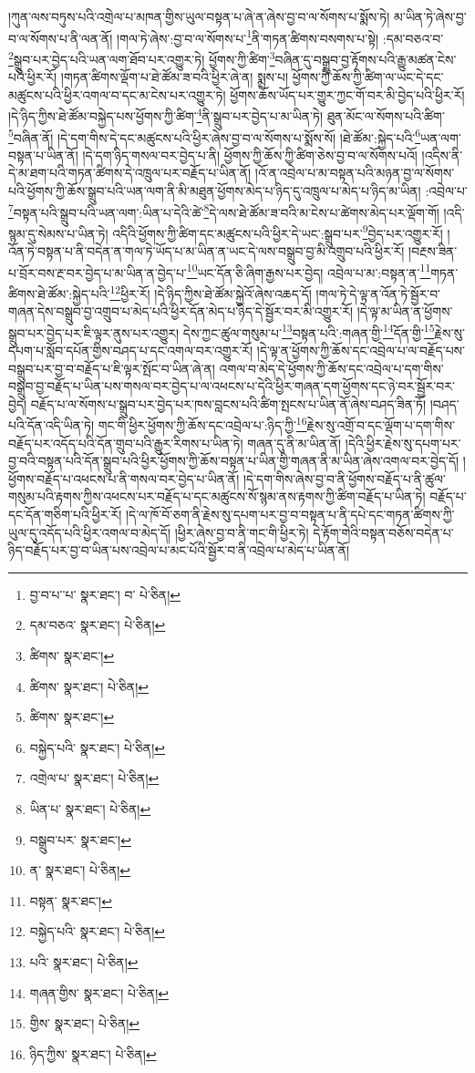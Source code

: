 །ཀུན་ལས་བཏུས་པའི་འགྲེལ་པ་མཁན་གྱིས་ཡུལ་བསྟན་པ་ཞེ་ན་ཞེས་བྱ་བ་ལ་སོགས་པ་སྨོས་ཏེ། མ་ཡིན་ཏེ་ཞེས་བྱ་བ་ལ་སོགས་པ་ནི་ལན་ནོ། །གལ་ཏེ་ཞེས་:བྱ་བ་ལ་སོགས་པ་\footnote{བྱ་བ་པ་་པ་  སྣར་ཐང་། བ་  པེ་ཅིན། }ནི་གཏན་ཚིགས་བསགས་པ་སྟེ། :དམ་བཅའ་བ་\footnote{དམ་བཅའ་  སྣར་ཐང་།  པེ་ཅིན། }སྒྲུབ་པར་བྱེད་པའི་ཡན་ལག་ཐོབ་པར་འགྱུར་ཏེ། ཕྱོགས་ཀྱི་ཚིག་\footnote{ཚིགས་  སྣར་ཐང་། }བཞིན་དུ་བསྒྲུབ་བྱ་རྟོགས་པའི་རྒྱུ་མཚན་ངེས་པའི་ཕྱིར་རོ། །གཏན་ཚིགས་ལྡོག་པ་ཐེ་ཚོམ་ཟ་བའི་ཕྱིར་ཞེ་ན། སྨྲས་པ། ཕྱོགས་ཀྱི་ཆོས་ཀྱི་ཚིག་ལ་ཡང་དེ་དང་མཚུངས་པའི་ཕྱིར་འགལ་བ་དང་མ་ངེས་པར་འགྱུར་ཏེ། ཕྱོགས་ཆོས་ཡོད་པར་གྱུར་ཀྱང་གོ་བར་མི་བྱེད་པའི་ཕྱིར་རོ། །དེ་ཉིད་ཀྱིས་ཐེ་ཚོམ་བསྐྱེད་པས་ཕྱོགས་ཀྱི་ཚིག་\footnote{ཚིགས་  སྣར་ཐང་།  པེ་ཅིན། }ནི་སྒྲུབ་པར་བྱེད་པ་མ་ཡིན་ཏེ། ཐུན་མོང་ལ་སོགས་པའི་ཚིག་\footnote{ཚིགས་  སྣར་ཐང་། }བཞིན་ནོ། །དེ་དག་གིས་དེ་དང་མཚུངས་པའི་ཕྱིར་ཞེས་བྱ་བ་ལ་སོགས་པ་སྨོས་སོ། །ཐེ་ཚོམ་:སྐྱེད་པའི་\footnote{བསྐྱེད་པའི་  སྣར་ཐང་།  པེ་ཅིན། }ཡན་ལག་བསྟན་པ་ཡིན་ནོ། །དེ་དག་ཉིད་གསལ་བར་བྱེད་པ་ནི། ཕྱོགས་ཀྱི་ཆོས་ཀྱི་ཚིག་ཅེས་བྱ་བ་ལ་སོགས་པའོ། །འདིས་ནི་དེ་མ་ཐག་པའི་གཏན་ཚིགས་དེ་འཁྲུལ་པར་བརྗོད་པ་ཡིན་ནོ། །འོ་ན་འབྲེལ་པ་མ་བསྟན་པའི་མཉན་བྱ་ལ་སོགས་པའི་ཕྱོགས་ཀྱི་ཆོས་སྒྲུབ་པའི་ཡན་ལག་ནི་མི་མཐུན་ཕྱོགས་མེད་པ་ཉིད་དུ་འཁྲུལ་པ་མེད་པ་ཉིད་མ་ཡིན། :འབྲེལ་པ་\footnote{འགྲེལ་པ་  སྣར་ཐང་།  པེ་ཅིན། }བསྟན་པའི་སྒྲུབ་པའི་ཡན་ལག་:ཡིན་པ་དེའི་ཚེ་\footnote{ཡིན་པ་  སྣར་ཐང་།  པེ་ཅིན། }དེ་ལས་ཐེ་ཚོམ་ཟ་བའི་མ་ངེས་པ་ཚེགས་མེད་པར་ལྡོག་གོ། །འདི་སྙམ་དུ་སེམས་པ་ཡིན་ཏེ། འདིའི་ཕྱོགས་ཀྱི་ཚིག་དང་མཚུངས་པའི་ཕྱིར་དེ་ཡང་:སྒྲུབ་པར་\footnote{བསྒྲུབ་པར་  སྣར་ཐང་། }བྱེད་པར་འགྱུར་རོ། །འོན་ཏེ་བསྟན་པ་ནི་བདེན་ན་གལ་ཏེ་ཡོད་པ་མ་ཡིན་ན་ཡང་དེ་ལས་བསྒྲུབ་བྱ་མི་འགྲུབ་པའི་ཕྱིར་རོ། །བརྔས་ཟིན་པ་བྲོར་བས་རྔ་བར་བྱེད་པ་མ་ཡིན་ན་བྱེད་པ་\footnote{ན་  སྣར་ཐང་།  པེ་ཅིན། }ཡང་དོན་ཅི་ཞིག་རྒྱས་པར་བྱེད། འབྲེལ་པ་མ་:བསྟན་ན་\footnote{བསྟན་  སྣར་ཐང་། }གཏན་ཚིགས་ཐེ་ཚོམ་:སྐྱེད་པའི་\footnote{བསྐྱེད་པའི་  སྣར་ཐང་།  པེ་ཅིན། }ཕྱིར་རོ། །དེ་ཉིད་ཀྱིས་ཐེ་ཚོམ་སྐྱེའོ་ཞེས་འཆད་དོ། །གལ་ཏེ་དེ་ལྟ་ན་འོན་ཏེ་སྦྱོར་བ་གཞན་དེས་བསྒྲུབ་བྱ་འགྲུབ་པ་མེད་པའི་ཕྱིར་དོན་མེད་པ་ཉིད་དེ་སྦྱོར་བར་མི་འགྱུར་རོ། །དེ་ལྟ་མ་ཡིན་ན་ཕྱོགས་སྒྲུབ་པར་བྱེད་པར་ཇི་ལྟར་ནུས་པར་འགྱུར། དེས་ཀྱང་ཚུལ་གསུམ་པ་\footnote{པའི་  སྣར་ཐང་།  པེ་ཅིན། }བསྟན་པའི་:གཞན་གྱི་\footnote{གཞན་གྱིས་  སྣར་ཐང་།  པེ་ཅིན། }དོན་གྱི་\footnote{གྱིས་  སྣར་ཐང་།  པེ་ཅིན། }རྗེས་སུ་དཔག་པ་སློབ་དཔོན་གྱིས་བཤད་པ་དང་འགལ་བར་འགྱུར་རོ། །དེ་ལྟ་ན་ཕྱོགས་ཀྱི་ཆོས་དང་འབྲེལ་པ་ལ་བརྗོད་པས་བསྒྲུབ་པར་བྱ་བ་བརྗོད་པ་ཇི་ལྟར་སྤོང་བ་ཡིན་ཞེ་ན། འགལ་བ་མེད་དེ་ཕྱོགས་ཀྱི་ཆོས་དང་འབྲེལ་པ་དག་གིས་བསྒྲུབ་བྱ་བརྗོད་པ་ཡིན་པས་གསལ་བར་བྱེད་པ་ལ་འཕངས་པ་དེའི་ཕྱིར་གཞན་དག་ཕྱོགས་དང་ཉེ་བར་སྦྱོར་བར་བྱེད། བརྗོད་པ་ལ་སོགས་པ་སྒྲུབ་པར་བྱེད་པར་ཁས་བླངས་པའི་ཚིག་སྤངས་པ་ཡིན་ནོ་ཞེས་བཤད་ཟིན་ཏོ། །བཤད་པའི་དོན་འདི་ཡིན་ཏེ། གང་གི་ཕྱིར་ཕྱོགས་ཀྱི་ཆོས་དང་འབྲེལ་པ་:ཉིད་ཀྱི་\footnote{ཉིད་ཀྱིས་  སྣར་ཐང་།  པེ་ཅིན། }རྗེས་སུ་འགྲོ་བ་དང་ལྡོག་པ་དག་གིས་བརྗོད་པར་འདོད་པའི་དོན་གྲུབ་པའི་རྒྱུར་རིགས་པ་ཡིན་ཏེ། གཞན་དུ་ནི་མ་ཡིན་ནོ། །དེའི་ཕྱིར་རྗེས་སུ་དཔག་པར་བྱ་བའི་བསྟན་པའི་དོན་སྒྲུབ་པའི་ཕྱིར་ཕྱོགས་ཀྱི་ཆོས་བསྟན་པ་ཡིན་གྱི་གཞན་ནི་མ་ཡིན་ཞེས་འགལ་བར་བྱེད་དོ། །ཕྱོགས་བརྗོད་པ་འཕངས་པ་ནི་གསལ་བར་བྱེད་པ་ཡིན་ནོ། །དེ་དག་གིས་ཞེས་བྱ་བ་ནི་ཕྱོགས་བརྗོད་པ་ནི་ཚུལ་གསུམ་པའི་རྟགས་ཀྱིས་འཕངས་པར་བརྗོད་པ་དང་མཚུངས་སོ་སྙམ་ནས་རྟགས་ཀྱི་ཚིག་བརྗོད་པ་ཡིན་ཏེ། བརྗོད་པ་དང་དོན་གཅིག་པའི་ཕྱིར་རོ། །དེ་ལ་ཁོ་བོ་ཅག་ནི་རྗེས་སུ་དཔག་པར་བྱ་བ་བསྟན་པ་ནི་དཔེ་དང་གཏན་ཚིགས་ཀྱི་ཡུལ་དུ་འདོད་པའི་ཕྱིར་འགལ་བ་མེད་དོ། །ཕྱིར་ཞེས་བྱ་བ་ནི་གང་གི་ཕྱིར་ཏེ། དེ་རྟོག་གེའི་བསྟན་བཅོས་བདེན་པ་ཉིད་བརྗོད་པར་བྱ་བ་ཡིན་པས་འབྲེལ་པ་མང་པོའི་སྦྱོར་བ་ནི་འབྲེལ་པ་མེད་པ་ཡིན་ནོ། 